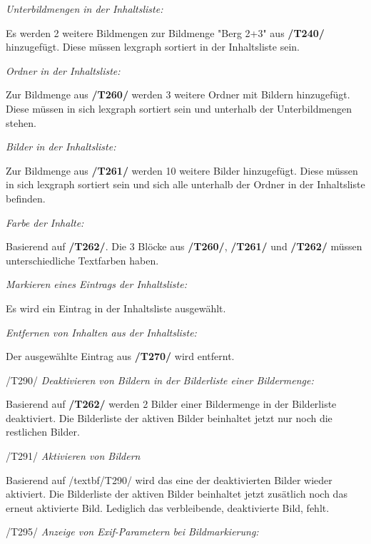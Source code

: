 \begin{description}
			\item[/T260/] \textit{Unterbildmengen in der Inhaltsliste:}\par Es werden 2 weitere Bildmengen zur Bildmenge "Berg 2+3" aus \textbf{/T240/} hinzugefügt. Diese müssen \gls{lexgraph} sortiert in der Inhaltsliste sein.
			\item[/T261/] \textit{Ordner in der Inhaltsliste:}\par Zur Bildmenge aus \textbf{/T260/} werden 3 weitere Ordner mit Bildern hinzugefügt. Diese müssen in sich \gls{lexgraph} sortiert sein und unterhalb der Unterbildmengen stehen.
			\item[/T262/] \textit{Bilder in der Inhaltsliste:}\par Zur Bildmenge aus \textbf{/T261/} werden 10 weitere Bilder hinzugefügt. Diese müssen in sich \gls{lexgraph} sortiert sein und sich alle unterhalb der Ordner in der Inhaltsliste befinden.
			\item[/T263/] \textit{Farbe der Inhalte:}\par Basierend auf \textbf{/T262/}. Die 3 Blöcke aus \textbf{/T260/}, \textbf{/T261/} und \textbf{/T262/} müssen unterschiedliche Textfarben haben. 
		
			\item[/T270/] \textit{Markieren eines Eintrags der Inhaltsliste:}\par Es wird ein Eintrag in der Inhaltsliste ausgewählt.
		
			\item[/T280/] \textit{Entfernen von Inhalten aus der Inhaltsliste:}\par Der ausgewählte Eintrag aus \textbf{/T270/} wird entfernt.
		
			\item{/T290/} \textit{Deaktivieren von Bildern in der Bilderliste einer Bildermenge:}\par Basierend auf \textbf{/T262/} werden 2 Bilder einer Bildermenge in der Bilderliste deaktiviert. Die Bilderliste der aktiven Bilder beinhaltet jetzt nur noch die restlichen Bilder.
			\item{/T291/} \textit{Aktivieren von Bildern}\par Basierend auf /textbf{/T290/} wird das eine der deaktivierten Bilder wieder aktiviert. Die Bilderliste der aktiven Bilder beinhaltet jetzt zusätlich noch das erneut aktivierte Bild. Lediglich das verbleibende, deaktivierte Bild, fehlt.
			
			\item{/T295/} \textit{Anzeige von Exif-Parametern bei Bildmarkierung:}\par
			
		\end{description}
	
